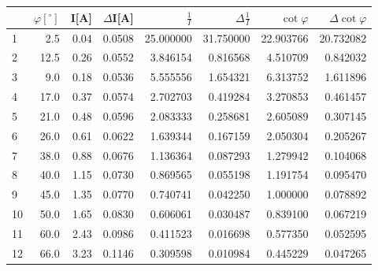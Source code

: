 \begin{tabular}{lrrrrrrr}
\toprule
{} &  $\varphi[^\circ]$ &  I[A] &  $\Delta$I[A] &  $\frac{1}{I}$ &  $\Delta \frac{1}{I}$ &  $\cot{\varphi}$ &  $\Delta \cot{\varphi}$ \\
\midrule
1  &                2.5 &  0.04 &        0.0508 &      25.000000 &             31.750000 &        22.903766 &               20.732082 \\
2  &               12.5 &  0.26 &        0.0552 &       3.846154 &              0.816568 &         4.510709 &                0.842032 \\
3  &                9.0 &  0.18 &        0.0536 &       5.555556 &              1.654321 &         6.313752 &                1.611896 \\
4  &               17.0 &  0.37 &        0.0574 &       2.702703 &              0.419284 &         3.270853 &                0.461457 \\
5  &               21.0 &  0.48 &        0.0596 &       2.083333 &              0.258681 &         2.605089 &                0.307145 \\
6  &               26.0 &  0.61 &        0.0622 &       1.639344 &              0.167159 &         2.050304 &                0.205267 \\
7  &               38.0 &  0.88 &        0.0676 &       1.136364 &              0.087293 &         1.279942 &                0.104068 \\
8  &               40.0 &  1.15 &        0.0730 &       0.869565 &              0.055198 &         1.191754 &                0.095470 \\
9  &               45.0 &  1.35 &        0.0770 &       0.740741 &              0.042250 &         1.000000 &                0.078892 \\
10  &               50.0 &  1.65 &        0.0830 &       0.606061 &              0.030487 &         0.839100 &                0.067219 \\
11 &               60.0 &  2.43 &        0.0986 &       0.411523 &              0.016698 &         0.577350 &                0.052595 \\
12 &               66.0 &  3.23 &        0.1146 &       0.309598 &              0.010984 &         0.445229 &                0.047265 \\
\bottomrule
\end{tabular}
